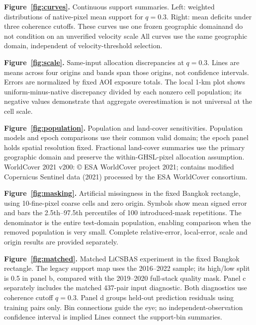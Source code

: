\documentclass[pdflatex,sn-nature]{sn-jnl}
\providecommand{\DIFadd}[1]{{\protect\color{blue} \sf #1}} %
\providecommand{\DIFdel}[1]{{\protect\color{red} \scriptsize #1}} %
\providecommand{\DIFaddbegin}{} %
\providecommand{\DIFaddend}{} %
\providecommand{\DIFdelbegin}{} %
\providecommand{\DIFdelend}{} %
\begin{document}
\noindent\textbf{Figure~\ref{fig:curves}.} Continuous support summaries. Left: weighted distributions of native-pixel mean support for $q=0.3$. Right: mean deficits under three coherence cutoffs. \DIFdelbegin \DIFdel{These curves use one frozen geographic domainand do not condition on an unverified velocity scale}\DIFdelend \DIFaddbegin \DIFadd{All curves use the same geographic domain, independent of velocity-threshold selection}\DIFaddend .

\noindent\textbf{Figure~\ref{fig:scale}.} Same-input allocation discrepancies at $q=0.3$. Lines are means across four origins and bands span those origins, not confidence intervals. Errors are normalized by fixed AOI exposure totals. The local 1-km plot shows uniform-minus-native discrepancy divided by each nonzero cell population; its negative values demonstrate that aggregate overestimation is not universal at the cell scale.

\noindent\textbf{Figure~\ref{fig:population}.} Population and land-cover sensitivities. Population models and epoch comparisons use their common valid domain; the epoch panel holds spatial resolution fixed. Fractional land-cover summaries use the primary geographic domain and preserve the within-GHSL-pixel allocation assumption. WorldCover 2021 v200: \copyright{} ESA WorldCover project 2021; contains modified Copernicus Sentinel data (2021) processed by the ESA WorldCover consortium.

\noindent\textbf{Figure~\ref{fig:masking}.} Artificial missingness in the fixed Bangkok rectangle, using 10-fine-pixel coarse cells and zero origin. Symbols show mean signed error and bars the 2.5th--97.5th percentiles of 100 introduced-mask repetitions. The denominator is the entire test-domain population, enabling comparison when the removed population is very small. Complete relative-error, local-error, scale and origin results are provided separately.

\noindent\textbf{Figure~\ref{fig:matched}.} Matched LiCSBAS experiment in the fixed Bangkok rectangle. The legacy support map uses the 2016--2022 sample; its high/low split is 0.5 in panel b, compared with the 2019--2020 full-stack quality mask. Panel c separately includes the matched 437-pair input diagnostic. Both diagnostics use coherence cutoff $q=0.3$. Panel d groups held-out prediction residuals using training pairs only. \DIFdelbegin \DIFdel{Bin connections guide the eye; no independent-observation confidence interval is implied}\DIFdelend \DIFaddbegin \DIFadd{Lines connect the support-bin summaries}\DIFaddend .
\end{document}
